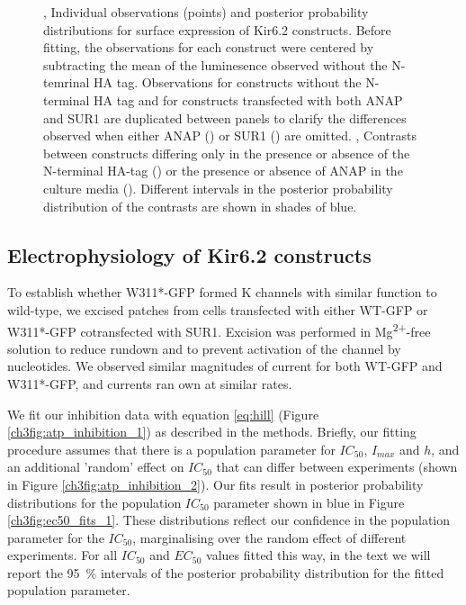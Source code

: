 \begin{figure}[h]
\begin{subfigure}[t]{0.45\textwidth}
	\end{subfigure}
	\caption[ANAP construct surface expression assay]{
	,  Individual observations (points) and posterior probability distributions for surface expression of Kir6.2 constructs.
	Before fitting, the observations for each construct were centered by subtracting the mean of the luminesence observed without the N-temrinal HA tag.
	Observations for constructs without the N-terminal HA tag and for constructs transfected with both ANAP and SUR1 are duplicated between panels to clarify the differences observed when either ANAP () or SUR1 () are omitted.
	,  Contrasts between constructs differing only in the presence or absence of the N-terminal HA-tag () or the presence or absence of ANAP in the culture media ().
	Different intervals in the posterior probability distribution of the contrasts are shown in shades of blue.
	}
\end{figure}

\subsection{Electrophysiology of Kir6.2 constructs}

To establish whether W311*-GFP formed K\ATP{} channels with similar function to wild-type, we excised patches from cells transfected with either WT-GFP or W311*-GFP cotransfected with SUR1.
Excision was performed in Mg\textsuperscript{2+}-free solution to reduce rundown and to prevent activation of the channel by nucleotides.
We observed similar magnitudes of current for both WT-GFP and W311*-GFP, and currents ran own at similar rates.

We fit our inhibition data with equation \ref{eq:hill} (Figure \ref{ch3fig:atp_inhibition_1}) as described in the methods.
Briefly, our fitting procedure assumes that there is a population parameter for $IC_{50}$, $I_{max}$ and $h$, and an additional 'random' effect on $IC_{50}$ that can differ between experiments (shown in Figure \ref{ch3fig:atp_inhibition_2}).
Our fits result in posterior probability distributions for the population $IC_{50}$ parameter shown in blue in Figure \ref{ch3fig:ec50_fits_1}.
These distributions reflect our confidence in the population parameter for the $IC_{50}$, marginalising over the random effect of different experiments.
For all $IC_50$ and $EC_{50}$ values fitted this way, in the text we will report the \SI{95}{\percent} intervals of the posterior probability distribution for the fitted population parameter.

